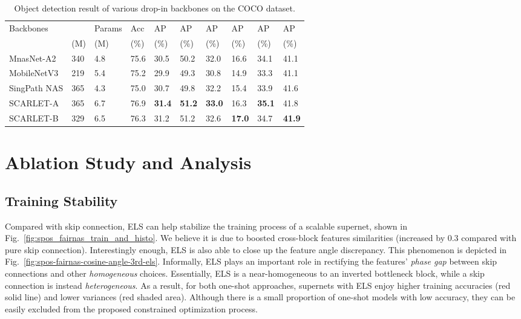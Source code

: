 \documentclass[10pt,twocolumn,letterpaper]{article}
\theoremstyle{definition}
\begin{document}
\begin{table*}
	\begin{center}
		\begin{tabular}{*{2}{|l}|H*{7}{l|}}
			\hline
			Backbones &   & Params &Acc    & AP & AP & AP & AP & AP & AP \\
& (M) & (M) & (\%) &(\%) & (\%)& (\%)&(\%) &(\%) &(\%) \\
			\hline
			MnasNet-A2 \cite{tan2018mnasnet} & 340& 4.8 & 75.6 & 30.5 & 50.2 & 32.0 & 16.6 & 34.1 & 41.1\\
			MobileNetV3 \cite{howard2019searching} & 219 & 5.4 & 75.2& 29.9 & 49.3 & 30.8 & 14.9 & 33.3 & 41.1\\

SingPath NAS \cite{stamoulis2019single} & 365 & 4.3 & 75.0 & 30.7 & 49.8 & 32.2 & 15.4 &33.9 & 41.6\\
SCARLET-A &365&6.7&76.9&\textbf{31.4}& \textbf{51.2}& \textbf{33.0}& 16.3& \textbf{35.1}&41.8\\
			SCARLET-B &329&6.5&76.3&31.2 & 51.2& 32.6 & \textbf{17.0} & 34.7& \textbf{41.9}\\
\hline
		\end{tabular}
		\smallskip
		\caption{Object detection result of various drop-in backbones on the COCO dataset.}
		\label{table:scarlet-coco-retina}
	\end{center}
\end{table*}




\section{Ablation Study and Analysis}





\subsection{Training Stability}

Compared with skip connection, ELS can help stabilize the training process of a scalable supernet, shown in Fig.~\ref{fig:spos_fairnas_train_and_histo}. We believe it is due to boosted cross-block features similarities (increased by 0.3 compared with pure skip connection). Interestingly enough, ELS is also able to close up the feature angle discrepancy. This phenomenon is depicted in Fig.~\ref{fig:spos-fairnas-cosine-angle-3rd-els}. Informally, ELS plays an important role in rectifying the features' \emph{phase gap} between skip connections and other \emph{homogeneous} choices. Essentially, ELS is a near-homogeneous  to an inverted bottleneck block, while a skip connection is instead \emph{heterogeneous}.  As a result, for both one-shot approaches, supernets with ELS enjoy higher training accuracies (red solid line) and lower variances (red shaded area). Although there is a small proportion of one-shot models with low accuracy, they can be easily excluded from the proposed constrained optimization process.
\end{document}
